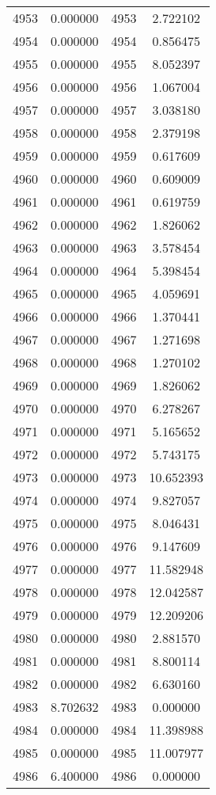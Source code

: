 \documentclass[12pt]{article}
\begin{document}
\begin{longtable}{@{}cccc@{}}
4953 & 0.000000 & 4953 & 2.722102 \\
4954 & 0.000000 & 4954 & 0.856475 \\
4955 & 0.000000 & 4955 & 8.052397 \\
4956 & 0.000000 & 4956 & 1.067004 \\
4957 & 0.000000 & 4957 & 3.038180 \\
4958 & 0.000000 & 4958 & 2.379198 \\
4959 & 0.000000 & 4959 & 0.617609 \\
4960 & 0.000000 & 4960 & 0.609009 \\
4961 & 0.000000 & 4961 & 0.619759 \\
4962 & 0.000000 & 4962 & 1.826062 \\
4963 & 0.000000 & 4963 & 3.578454 \\
4964 & 0.000000 & 4964 & 5.398454 \\
4965 & 0.000000 & 4965 & 4.059691 \\
4966 & 0.000000 & 4966 & 1.370441 \\
4967 & 0.000000 & 4967 & 1.271698 \\
4968 & 0.000000 & 4968 & 1.270102 \\
4969 & 0.000000 & 4969 & 1.826062 \\
4970 & 0.000000 & 4970 & 6.278267 \\
4971 & 0.000000 & 4971 & 5.165652 \\
4972 & 0.000000 & 4972 & 5.743175 \\
4973 & 0.000000 & 4973 & 10.652393 \\
4974 & 0.000000 & 4974 & 9.827057 \\
4975 & 0.000000 & 4975 & 8.046431 \\
4976 & 0.000000 & 4976 & 9.147609 \\
4977 & 0.000000 & 4977 & 11.582948 \\
4978 & 0.000000 & 4978 & 12.042587 \\
4979 & 0.000000 & 4979 & 12.209206 \\
4980 & 0.000000 & 4980 & 2.881570 \\
4981 & 0.000000 & 4981 & 8.800114 \\
4982 & 0.000000 & 4982 & 6.630160 \\
4983 & 8.702632 & 4983 & 0.000000 \\
4984 & 0.000000 & 4984 & 11.398988 \\
4985 & 0.000000 & 4985 & 11.007977 \\
4986 & 6.400000 & 4986 & 0.000000 \\

\end{longtable}
\end{document}
